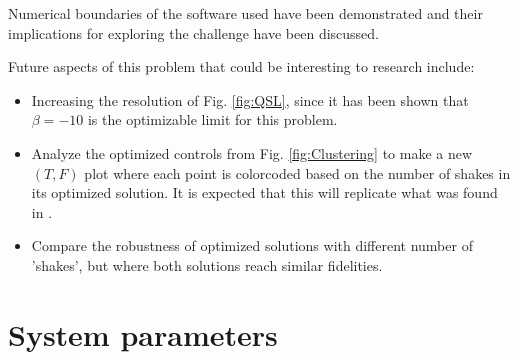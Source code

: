 \documentclass[a4paper, twocolumn]{revtex4-1}
\begin{document}
Numerical boundaries of the software used have been demonstrated and their implications for exploring the challenge have been discussed.

Future aspects of this problem that could be interesting to research include:
\begin{itemize}
	\item Increasing the resolution of Fig. \ref{fig:QSL}, since it has been shown that $\beta=-10$ is the optimizable limit for this problem.
	\item Analyze the optimized controls from Fig. \ref{fig:Clustering} to make a new $(T,F)$ plot where each point is colorcoded based on the number of shakes in its optimized solution. It is expected that this will replicate what was found in \cite{QM2Paper}.
	\item Compare the robustness of optimized solutions with different number of 'shakes', but where both solutions reach similar fidelities.
\end{itemize}



\appendix
\section{System parameters}\label{sec:System-params}
\end{document}
